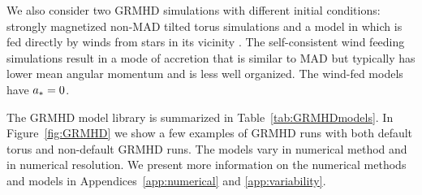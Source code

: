 We also consider two GRMHD simulations with different initial conditions: strongly magnetized non-MAD tilted torus simulations \citep{Liska2018, Chatterjee2020} and a model in which \sgra is fed directly by winds from stars in its vicinity \citep{2020ApJ...896L...6R}.
The self-consistent wind feeding simulations result in a mode of accretion that is similar to MAD but typically has lower mean angular momentum and is less well organized.
The wind-fed models have $a_* = 0$.

The GRMHD model library is summarized in Table~\ref{tab:GRMHDmodels}.
In Figure~\ref{fig:GRMHD} we show a few examples of GRMHD runs with both default torus and non-default GRMHD runs.
The models vary in numerical method and in numerical resolution. We present more information on the numerical methods and models in Appendices~\ref{app:numerical} and \ref{app:variability}.

